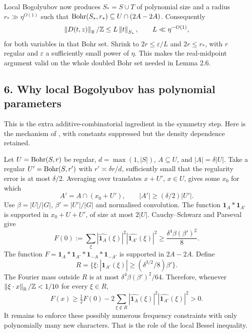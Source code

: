 Local Bogolyubov now produces $S_*=S\cup T$ of polynomial size and a
radius $r_*\gg\eta^{O(1)}$ such that
$\operatorname{Bohr}(S_*,r_*)\subseteq U\cap(2A-2A)$. Consequently
\[\left\|D(t,z)\right\|_\mathbb R/\mathbb Z\leq L\left\|t\right\|_{S_*},\qquad L\ll\eta^{-O(1)},\]
for both variables in that Bohr set. Shrink to $2r\leq\varepsilon/L$
and $2r\leq r_*$, with $r$ regular and $\varepsilon$ a sufficiently
small power of $\eta$. This makes the real-midpoint argument valid on
the whole doubled Bohr set needed in Lemma 2.6.

\subsection*{6. Why local Bogolyubov has polynomial parameters}
This is the extra additive-combinatorial ingredient in the symmetry
step. Here is the mechanism of , with constants suppressed
but the density dependence retained.

Let $U=\operatorname{Bohr}(S,r)$ be regular, $d=\max(1,|S|)$,
$A\subseteq U$, and $|A|=\delta|U|$. Take a regular
$U'=\operatorname{Bohr}(S,r')$ with $r'\asymp\delta r/d$, sufficiently small that
the regularity error is at most $\delta/2$. Averaging over translates
$x+U'$, $x\in U$, gives some $x_0$ for which
\[A'=A\cap(x_0+U'),\qquad |A'|\geq(\delta/2)|U'|.\]
Use $\beta=|U|/|G|$, $\beta'=|U'|/|G|$ and normalised convolution.
The function $\mathbf1_A*\mathbf1_{A'}$ is supported in
$x_0+U+U'$, of size at most $2|U|$. Cauchy--Schwarz and Parseval give
\[
F(0):=\sum_\xi|\widehat{\mathbf1_A}(\xi)|^2
                         |\widehat{\mathbf1_{A'}}(\xi)|^2
\geq\frac{\delta^4\beta(\beta')^2}{8}.
\]
The function
$F=\mathbf1_A*\mathbf1_{A'}*\mathbf1_{-A}*\mathbf1_{-A'}$
is supported in $2A-2A$. Define
\[R=\{\xi:|\widehat{\mathbf1_{A'}}(\xi)|\geq
                       (\delta^{3/2}/8)\beta'\}.\]
The Fourier mass outside $R$ is at most
$\delta^4\beta(\beta')^2/64$. Therefore, whenever
$\left\|\xi\cdot x\right\|_\mathbb R/\mathbb Z<1/10$ for every $\xi\in R$,
\[
F(x)\geq\tfrac12F(0)-2\sum_{\xi\notin R}
|\widehat{\mathbf1_A}(\xi)|^2|\widehat{\mathbf1_{A'}}(\xi)|^2>0.
\]
It remains to enforce these possibly numerous frequency constraints with
only polynomially many new characters. That is the role of the local
Bessel inequality.

